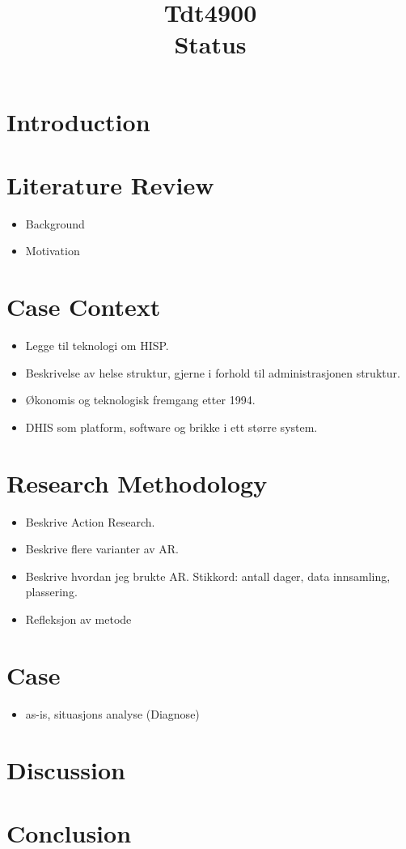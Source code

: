 \documentclass{article}
\title{Tdt4900 \\ Status}
\begin{document}
\maketitle
\section{Introduction}

\section{Literature Review}
\begin{itemize}
\item Background
\item Motivation
\end{itemize}
\section{Case Context}
\begin{itemize}
\item Legge til teknologi om HISP.
\item Beskrivelse av helse struktur, gjerne i forhold til administrasjonen struktur.
\item Økonomis og teknologisk fremgang etter 1994.
\item DHIS som platform, software og brikke i ett større system.
\end{itemize}
\section{Research Methodology}
\begin{itemize}
\item Beskrive Action Research.
\item Beskrive flere varianter av AR.
\item Beskrive hvordan jeg brukte AR. Stikkord: antall dager, data innsamling, plassering.
\item Refleksjon av metode
\end{itemize}
\section{Case}
\begin{itemize}
\item as-is, situasjons analyse  (Diagnose) 
\end{itemize}
\section{Discussion}
\section{Conclusion}
\end{document}
